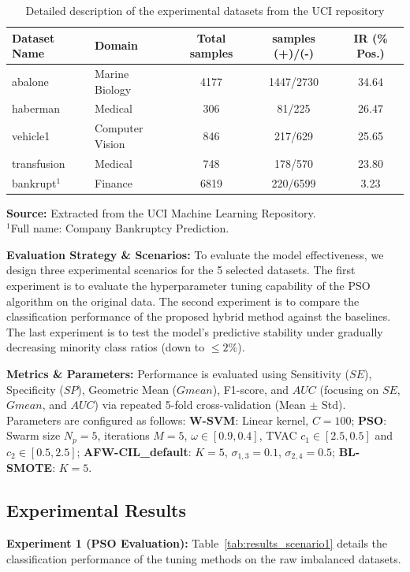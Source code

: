 \documentclass[pdflatex,sn-mathphys-num]{sn-jnl}%
\theoremstyle{thmstyleone}%
\theoremstyle{thmstyletwo}
\theoremstyle{thmstylethree}
\begin{document}
\begin{table}[htbp]
\caption{Detailed description of the experimental datasets from the UCI repository}\label{tab:datasets}
\begin{tabular*}{\textwidth}{@{\extracolsep\fill}llccc@{\extracolsep\fill}}
\toprule
Dataset Name & Domain  & Total samples & samples (+)/(-) &  IR (\% Pos.) \\
\midrule
abalone & Marine Biology & 4177 & 1447/2730 & 34.64 \\
haberman & Medical & 306 & 81/225 & 26.47 \\
vehicle1 & Computer Vision & 846 & 217/629 & 25.65 \\
transfusion & Medical & 748 & 178/570 & 23.80 \\
bankrupt$^1$ & Finance & 6819 & 220/6599 & 3.23 \\
\bottomrule
\end{tabular*}
\smallskip
\noindent \footnotesize \textbf{Source:} Extracted from the UCI Machine Learning Repository. \\
\noindent \footnotesize $^1$Full name: Company Bankruptcy Prediction.
\end{table}

\smallskip
\noindent \textbf{Evaluation Strategy \& Scenarios:} To evaluate the model effectiveness, we design three experimental scenarios for the 5 selected datasets. The first experiment is to evaluate the hyperparameter tuning capability of the PSO algorithm on the original data. The second experiment is to compare the classification performance of the proposed hybrid method against the baselines. The last experiment is to test the model's predictive stability under gradually decreasing minority class ratios (down to $\le 2\%$). 

\smallskip
\noindent \textbf{Metrics \& Parameters:} Performance is evaluated using Sensitivity ($SE$), Specificity ($SP$), Geometric Mean ($Gmean$), F1-score, and $AUC$ (focusing on $SE$, $Gmean$, and $AUC$) via repeated 5-fold cross-validation (Mean $\pm$ Std). Parameters are configured as follows: \textbf{W-SVM}: Linear kernel, $C=100$; \textbf{PSO}: Swarm size $N_p=5$, iterations $M=5$, $\omega \in [0.9, 0.4]$, TVAC $c_1 \in [2.5, 0.5]$ and $c_2 \in [0.5, 2.5]$; \textbf{AFW-CIL\_default}: $K=5$, $\sigma_{1,3}=0.1$, $\sigma_{2,4}=0.5$; \textbf{BL-SMOTE}: $K=5$.


\subsection{Experimental Results}\label{subsec4_2}
\smallskip
\noindent \textbf{Experiment 1 (PSO Evaluation):} Table~\ref{tab:results_scenario1} details the classification performance of the tuning methods on the raw imbalanced datasets.
\end{document}
